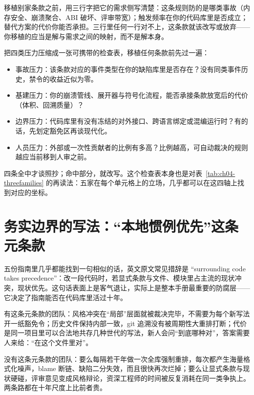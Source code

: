 \documentclass[12pt,a4paper,fontset=fandol]{ctexbook}
\begin{document}
\begin{bestpractice}[title={读指南先重建压力函数}]
移植别家条款之前，用三行字把它的需求侧写清楚：这条规则防的是哪类事故（内存安全、崩溃聚合、ABI 破坏、评审带宽）；触发频率在你的代码库里是否成立；替代方案的代价你能否承担。三行里任何一行对不上，这条款就该改写或放弃——你移植的应当是解与需求之间的映射，而不是解本身。
\end{bestpractice}

把四类压力压缩成一张可携带的检查表，移植任何条款前先过一遍：

\begin{itemize}
  \item 事故压力：该条款对应的事件类型在你的缺陷库里是否存在？没有同类事件历史，禁令的收益近似为零。
  \item 基建压力：你的崩溃管线、展开器与符号化流程，能否承接条款放宽后的代价（体积、回溯质量）？
  \item 边界压力：代码库里有没有冻结的对外接口、跨语言绑定或混编运行时？有的话，先划定豁免区再谈现代化。
  \item 人员压力：外部或一次性贡献者的比例有多高？比例越高，可自动裁决的规则越应当前移到人审之前。
\end{itemize}

四条全中才谈照抄；命中部分，就改写。这个检查表本身也是对表~\ref{tab:ch04-threefamilies} 的再读法：五家在每个单元格上的立场，几乎都可以在这四轴上找到对应的坐标。

\section{务实边界的写法：``本地惯例优先''这条元条款}
\label{sec:ch04-surrounding}

五份指南里几乎都能找到一句相似的话，英文原文常见措辞是 ``surrounding code takes precedence''：改一段代码时，若显式条款与文件、模块里占主流的现状冲突，现状优先。这句话表面上是客气退让，实际上是整本手册最重要的防腐层——它决定了指南能否在代码库里活过十年。

\begin{compare}[title={有 / 无这条元条款的两个团队，十年之后}]
有这条元条款的团队：风格冲突在``局部''层面就被裁决完毕，不需要为每个新写法开一纸豁免令；历史文件保持内部一致，git 追溯没有被周期性大重排打断；代价是同一项目里可以合法地共存几种世代的写法，新人会问``到底哪种对''，答案需要人来给：``在这个文件里对''。

没有这条元条款的团队：要么每隔若干年做一次全库强制重排，每次都产生海量格式化噪声，blame 断链、缺陷二分失效，而且很快再次烂掉；要么让显式条款与现状硬碰，评审意见变成风格辩论，资深工程师的时间被反复消耗在同一类争执上。两条路都在十年尺度上比前者贵。
\end{compare}
\end{document}
